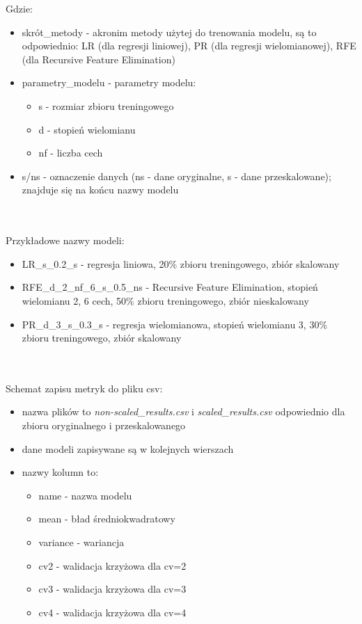 \documentclass[11pt, a4paper, notitlepage]{report}
\begin{document}
Gdzie:
\begin{itemize}
	\item skrót\_metody - akronim metody użytej do trenowania modelu, są to odpowiednio: LR (dla regresji liniowej), PR (dla regresji wielomianowej), RFE (dla Recursive Feature Elimination)
	\item parametry\_modelu - parametry modelu: \begin{itemize}
		\item s - rozmiar zbioru treningowego
		\item d - stopień wielomianu
		\item nf - liczba cech
	\end{itemize}
	\item s/ns - oznaczenie danych (ns - dane oryginalne, s - dane przeskalowane); znajduje się na końcu nazwy modelu
\end{itemize}
\\ \\
Przykładowe nazwy modeli:
\begin{itemize}
	\item LR\_s\_0.2\_s - regresja liniowa, 20\% zbioru treningowego, zbiór skalowany
	\item RFE\_d\_2\_nf\_6\_s\_0.5\_ns - Recursive Feature Elimination, stopień wielomianu 2, 6 cech, 50\% zbioru treningowego, zbiór nieskalowany
	\item PR\_d\_3\_s\_0.3\_s - regresja wielomianowa, stopień wielomianu 3, 30\% zbioru treningowego, zbiór skalowany
\end{itemize}
\\ \\
Schemat zapisu metryk do pliku csv:
\begin{itemize}
	\item nazwa plików to \textit{non-scaled\_results.csv} i \textit{scaled\_results.csv} odpowiednio dla zbioru oryginalnego i przeskalowanego
	\item dane modeli zapisywane są w kolejnych wierszach
	\item nazwy kolumn to: \begin{itemize}
		\item name - nazwa modelu
	   \item mean - bład średniokwadratowy
	   \item variance - wariancja
	   \item cv2 - walidacja krzyżowa dla cv=2
	   \item cv3 - walidacja krzyżowa dla cv=3
	   \item cv4 - walidacja krzyżowa dla cv=4
	   \end{itemize}
\end{itemize}
\end{document}
